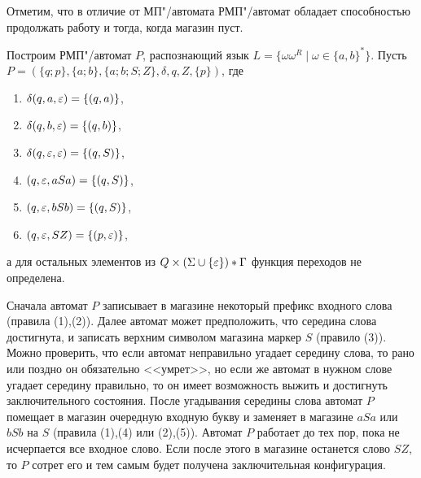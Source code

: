Отметим, что в отличие от МП"/автомата РМП"/автомат обладает способностью продолжать работу и тогда, когда магазин пуст.

\begin{myexample}
\label{example-langwwr-rmp}
Построим РМП"/автомат $P$, распознающий язык $L=\{\omega\omega^R\mid \omega\in\{a,b\}^*\}$. Пусть $P=(\{q;p\},\{a;b\},\{a;b;S;Z\},\delta,q,Z,\{p\})$, где

\begin{enumerate}
\item $\delta(q,a,\varepsilon) = \{(q,a)\}$,
\item $\delta(q,b,\varepsilon) = \{(q,b)\}$,
\item $\delta(q,\varepsilon,\varepsilon) = \{(q,S)\}$,
\item $(q,\varepsilon,aSa) = \{(q,S)\}$,
\item $(q,\varepsilon,bSb) = \{(q,S)\}$,
\item $(q,\varepsilon,SZ) = \{(p,\varepsilon)\}$,
\end{enumerate}
а для остальных элементов из $Q\times(\Sigma\cup\{\varepsilon\})*\Gamma$ функция переходов не определена.

Сначала автомат $P$ записывает в магазине некоторый префикс входного слова (правила (1),(2)). Далее автомат может предположить, что середина слова достигнута, и записать верхним символом магазина маркер $S$ (правило (3)). Можно проверить, что если автомат неправильно угадает середину слова, то рано или поздно он обязательно <<умрет>>, но если же автомат в нужном слове угадает середину правильно, то он имеет возможность выжить и достигнуть заключительного состояния. После угадывания середины слова автомат $P$ помещает в магазин очередную входную букву и заменяет в магазине $aSa$ или $bSb$ на $S$ (правила (1),(4) или (2),(5)). Автомат $P$ работает до тех пор, пока не исчерпается все входное слово. Если после этого в магазине останется слово $SZ$, то $P$ сотрет его и тем самым будет получена заключительная конфигурация.


\end{myexample}
